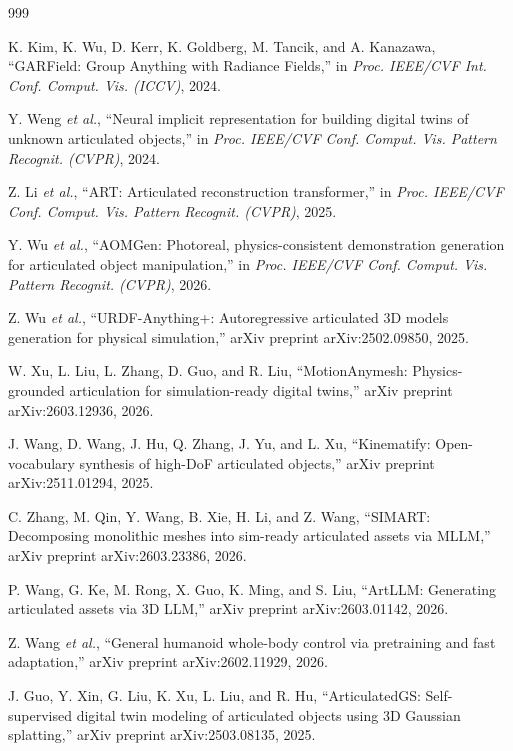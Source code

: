 ﻿\documentclass[11pt,a4paper]{article}
\begin{document}
\begin{thebibliography}{999}

K. Kim, K. Wu, D. Kerr, K. Goldberg, M. Tancik, and A. Kanazawa, ``GARField: Group Anything with Radiance Fields,'' in \textit{Proc. IEEE/CVF Int. Conf. Comput. Vis. (ICCV)}, 2024.

Y. Weng \textit{et al.}, ``Neural implicit representation for building digital twins of unknown articulated objects,'' in \textit{Proc. IEEE/CVF Conf. Comput. Vis. Pattern Recognit. (CVPR)}, 2024.

Z. Li \textit{et al.}, ``{ART}: Articulated reconstruction transformer,'' in \textit{Proc. IEEE/CVF Conf. Comput. Vis. Pattern Recognit. (CVPR)}, 2025.

Y. Wu \textit{et al.}, ``{AOMGen}: Photoreal, physics-consistent demonstration generation for articulated object manipulation,'' in \textit{Proc. IEEE/CVF Conf. Comput. Vis. Pattern Recognit. (CVPR)}, 2026.

Z. Wu \textit{et al.}, ``{URDF-Anything+}: Autoregressive articulated {3D} models generation for physical simulation,'' arXiv preprint arXiv:2502.09850, 2025.

W. Xu, L. Liu, L. Zhang, D. Guo, and R. Liu, ``{MotionAnymesh}: Physics-grounded articulation for simulation-ready digital twins,'' arXiv preprint arXiv:2603.12936, 2026.

J. Wang, D. Wang, J. Hu, Q. Zhang, J. Yu, and L. Xu, ``Kinematify: Open-vocabulary synthesis of high-{DoF} articulated objects,'' arXiv preprint arXiv:2511.01294, 2025.

C. Zhang, M. Qin, Y. Wang, B. Xie, H. Li, and Z. Wang, ``{SIMART}: Decomposing monolithic meshes into sim-ready articulated assets via {MLLM},'' arXiv preprint arXiv:2603.23386, 2026.

P. Wang, G. Ke, M. Rong, X. Guo, K. Ming, and S. Liu, ``ArtLLM: Generating articulated assets via {3D} LLM,'' arXiv preprint arXiv:2603.01142, 2026.

Z. Wang \textit{et al.}, ``General humanoid whole-body control via pretraining and fast adaptation,'' arXiv preprint arXiv:2602.11929, 2026.

J. Guo, Y. Xin, G. Liu, K. Xu, L. Liu, and R. Hu, ``{ArticulatedGS}: Self-supervised digital twin modeling of articulated objects using {3D} Gaussian splatting,'' arXiv preprint arXiv:2503.08135, 2025.


\end{thebibliography}
\end{document}
